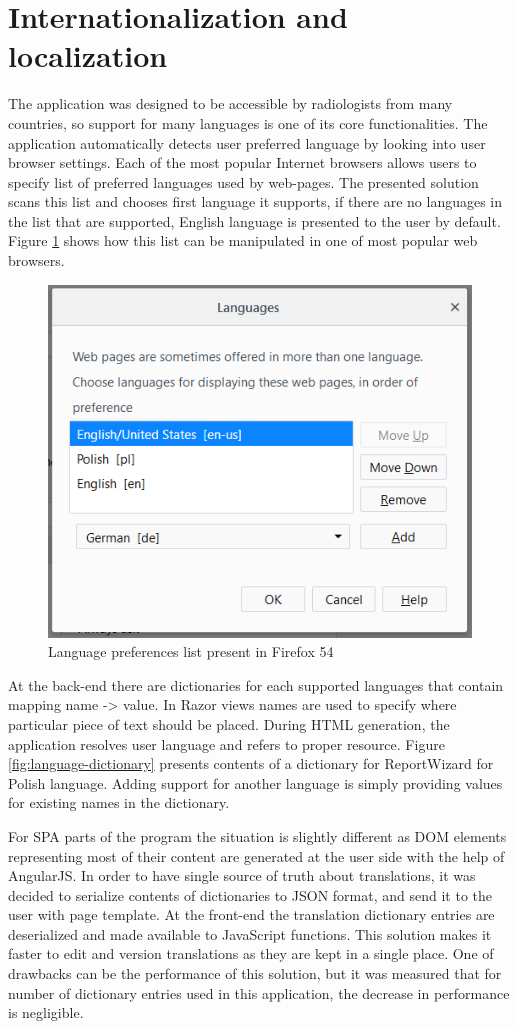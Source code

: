 \documentclass[12pt, twoside, openany]{report}
\theoremstyle{definition}
\begin{document}
\section{Internationalization and localization}
The application was designed to be accessible by radiologists from many countries, so support for many languages is one of its core functionalities. The application automatically detects user preferred language by looking into user browser settings. Each of the most popular Internet browsers allows users to specify list of preferred languages used by web-pages. The presented solution scans this list and chooses first language it supports, if there are no languages in the list that are supported, English language is presented to the user by default. Figure \ref{fig:language-preferences} shows how this list can be manipulated in one of most popular web browsers.
\begin{figure}
    \centering
    \includegraphics[width=0.6\linewidth]{language-preferences}
    \caption{Language preferences list present in Firefox 54\label{fig:language-preferences}}
\end{figure}

At the back-end there are dictionaries for each supported languages that contain mapping name -> value. 
In Razor views names are used to specify where particular piece of text should be placed. During HTML generation, the application resolves user language and refers to proper resource. Figure \ref{fig:language-dictionary} presents contents of a dictionary for ReportWizard for Polish language. Adding support for another language is simply providing values for existing names in the dictionary.

For SPA parts of the program the situation is slightly different as DOM elements representing most of their content are generated at the user side with the help of AngularJS. In order to have single source of truth about translations, it was decided to serialize contents of dictionaries to JSON format, and send it to the user with page template. At the front-end the translation dictionary entries are deserialized and made available to JavaScript functions. This solution makes it faster to edit and version translations as they are kept in a single place. One of drawbacks can be the performance of this solution, but it was measured that for number of dictionary entries used in this application, the decrease in performance is negligible.
 
\end{document}

